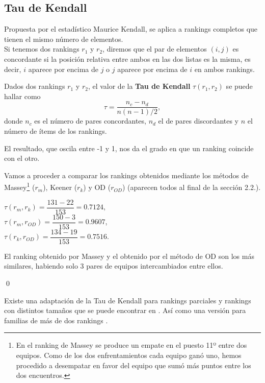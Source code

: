 \subsection{Tau de Kendall}
Propuesta por el estadístico Maurice Kendall, se aplica a rankings completos que tienen el mismo número de elementos. \\

Si tenemos dos rankings $r_{1}$ y $r_{2}$, diremos que el par de elementos $(i,j)$ es concordante si la posición relativa entre ambos en las dos listas es la misma, es decir, $i$ aparece por encima de $j$ o $j$ aparece por encima de $i$ en ambos rankings.

\begin{defi} Dados dos rankings $r_{1}$ y $r_{2}$, el valor de la \textbf{Tau de Kendall} $\tau(r_{1},r_{2})$ se puede hallar como
	\begin{equation}
	\tau = \dfrac{n_{c} - n_{d}}{n(n-1)/2},
	\end{equation}
donde $n_{c}$ es el número de pares concordantes, $n_{d}$ el de pares discordantes y $n$ el número de ítems de los rankings. 
\end{defi}

El resultado, que oscila entre -1 y 1, nos da el grado en que un ranking coincide con el otro.

\newpage

\begin{ejem} Vamos a proceder a comparar los rankings obtenidos mediante los métodos de Massey\footnote{En el ranking de Massey se produce un empate en el puesto 11º entre dos equipos. Como de los dos enfrentamientos cada equipo ganó uno, hemos procedido a desempatar en favor del equipo que sumó más puntos entre los dos encuentros.} ($r_{m}$), Keener ($r_{k}$) y OD ($r_{OD}$) (aparecen todos al final de la sección 2.2.).
\end{ejem}
\begin{center}
$ \tau (r_{m},r_{k}) = \dfrac{131-22}{153} = 0.7124$,\\
$ \tau (r_{m},r_{OD}) = \dfrac{150-3}{153} = 0.9607$,\\
$ \tau (r_{k},r_{OD}) = \dfrac{134-19}{153} = 0.7516$.
\end{center}
	
El ranking obtenido por Massey y el obtenido por el método de OD son los más similares, habiendo solo 3 pares de equipos intercambiados entre ellos.

\qed

Existe una adaptación de la Tau de Kendall para rankings parciales y rankings con distintos tamaños que se puede encontrar en \cite[págs 205-206]{libro_rankings}. Así como una versión para familias de más de dos rankings \cite{refcomp}.


